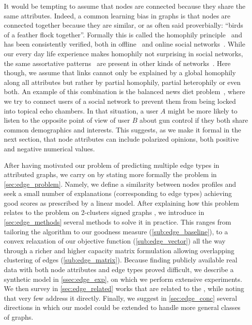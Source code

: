 It would be tempting to assume that nodes are connected because they share the same attributes.
Indeed, a common learning bias in graphs is
that nodes are connected together because they are similar, or as often said proverbially:
\enquote{birds of a feather flock together}. Formally this is called the homophily
principle~\autocite{Homophily01} and has been consistently verified, both in
offline~\autocites{homoAttitude78}{homoEdu85} and online social
networks~\autocites{homoSN09}{homoSN12}. While our every day life experience makes homophily not
surprising in social networks, the same assortative patterns~\autocite{AssortativeMixing02} are
present in other kinds of networks~\autocite{AssortativeMixing09}. Here though, we assume that links
cannot only be explained by a global homophily along all attributes but rather by partial homophily,
partial heterophily or even both. An example of this combination is the balanced news
diet problem~\autocite{balancedNews17}, where we try to connect users of a social network to prevent them
from being locked into topical echo chambers. In that situation, a user $A$ might be more likely to listen to
the opposite point of view of user $B$ about gun control if they both share common demographics and
interests. This suggests, as we make it formal in the next section, that node attributes can include
polarized opinions, \ie{} both positive and negative numerical values.

\medskip

After having motivated our problem of predicting multiple edge types in attributed graphs, we carry
on by stating more formally the \ecp{} problem in \autoref{sec:edge_problem}. Namely, we define a
similarity between nodes profiles and seek a small number of explanations (corresponding to edge
types) achieving good scores as prescribed by a linear model. After explaining how this problem relates
to the \esp{} problem on 2-clusters signed graphs
, we introduce in \autoref{sec:edge_methods} several
methods to solve it in practice. This ranges from tailoring the \kmeans{} algorithm to our goodness
measure (\autoref{sub:edge_baseline}), to a convex relaxation of our objective function
(\autoref{sub:edge_vector}) all the way through a richer and higher capacity matrix formulation allowing
overlapping clustering of edges (\autoref{sub:edge_matrix}). Because finding publicly available real
data with both node attributes and edge types proved difficult, we describe a synthetic model in
\autoref{ssec:edge_exp}, on which we perform extensive experiments. We then survey in
\autoref{sec:edge_related} works that are related to the \ecp{}, while noting that very few address
it directly. Finally, we suggest in \autoref{sec:edge_conc} several directions in which our model
could be extended to handle more general classes of graphs.
